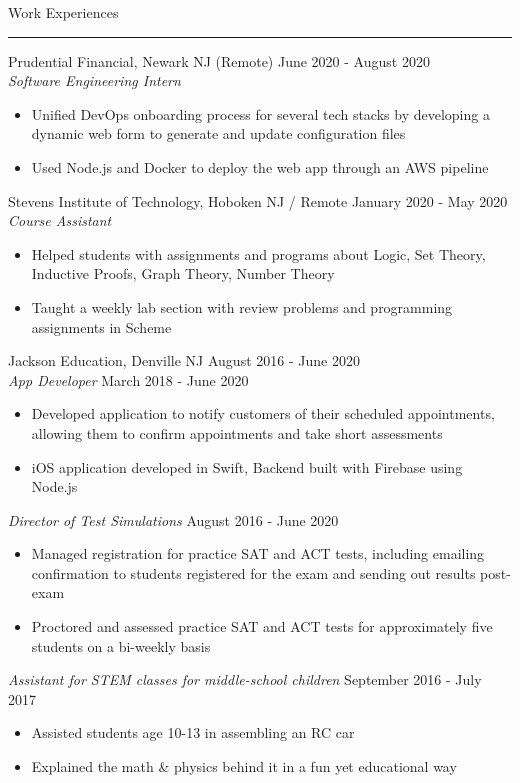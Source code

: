 \documentclass{article}
\begin{document}
\noindent
\huge Work Experiences\par
\vspace{0.1em}
\hrule
\Large
\vspace{1em}
\noindent
Prudential Financial, Newark NJ (Remote)
\hfill
June 2020 - August 2020\\
\textit{Software Engineering Intern}\\
\vspace{-1em}
\begin{itemize}
\item Unified DevOps onboarding process for several tech stacks by developing a dynamic web form to generate and update configuration files
\item Used Node.js and Docker to deploy the web app through an AWS pipeline
\end{itemize}
Stevens Institute of Technology, Hoboken NJ / Remote
\hfill
January 2020 - May 2020\\
\textit{Course Assistant}\\
\vspace{-1em}
\begin{itemize}
\item Helped students with assignments and programs about Logic, Set Theory, Inductive Proofs, Graph Theory, Number Theory
\item Taught a weekly lab section with review problems and programming assignments in Scheme
\end{itemize}
Jackson Education, Denville NJ
\hfill
August 2016 - June 2020\\
\textit{App Developer}
\hfill
March 2018 - June 2020\\
\vspace{-1em}
\begin{itemize}
\item Developed application to notify customers of their scheduled appointments, allowing them to \mbox{confirm} appointments and take short assessments
\item iOS application developed in Swift, Backend built with Firebase using Node.js
\end{itemize}
\textit{Director of Test Simulations}
\hfill
August 2016 - June 2020\\
\vspace{-1em}
\begin{itemize}
\item Managed registration for practice SAT and ACT tests, including emailing confirmation to students registered for the exam and sending out results post-exam
\item Proctored and assessed practice SAT and ACT tests for approximately five students on a bi-weekly basis
\end{itemize}
\textit{Assistant for STEM classes for middle-school children}
\hfill
September 2016 - July 2017
\begin{itemize}
\item Assisted students age 10-13 in assembling an RC car
\item Explained the math \& physics behind it in a fun yet educational way
\end{itemize}
\end{document}
